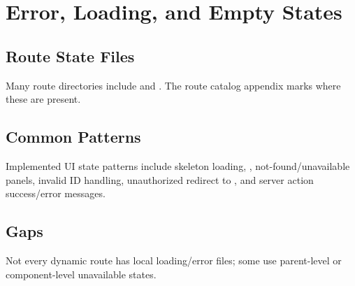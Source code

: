 \chapter{Error, Loading, and Empty States}
\section{Route State Files}
Many route directories include  and . The route catalog appendix marks where these are present.

\section{Common Patterns}
Implemented UI state patterns include skeleton loading, , not-found/unavailable panels, invalid ID handling, unauthorized redirect to , and server action success/error messages.

\section{Gaps}
Not every dynamic route has local loading/error files; some use parent-level or component-level unavailable states.
